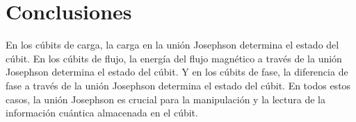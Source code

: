 \documentclass[12pt]{article}
\begin{document}
\section{Conclusiones}
En los cúbits de carga, la carga en la unión Josephson determina el estado del cúbit. En los cúbits de flujo, la energía del flujo magnético a través de la unión Josephson determina el estado del cúbit. Y en los cúbits de fase, la diferencia de fase a través de la unión Josephson determina el estado del cúbit. En todos estos casos, la unión Josephson es crucial para la manipulación y la lectura de la información cuántica almacenada en el cúbit.

\printbibliography
\end{document}
